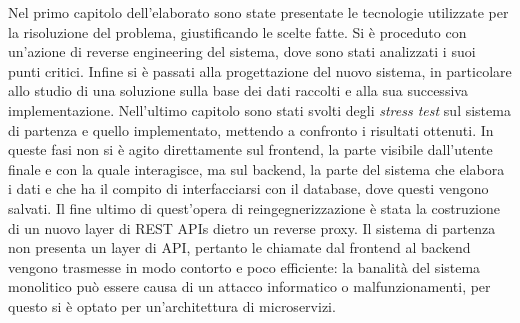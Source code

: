 \documentclass[a4paper,11pt]{article}
\begin{document}
	   Nel primo capitolo dell'elaborato sono state presentate le tecnologie utilizzate per la risoluzione del problema, giustificando le scelte fatte.  Si è proceduto con un'azione di reverse engineering del sistema, dove sono stati analizzati i suoi punti critici. Infine si è passati alla progettazione del nuovo sistema, in particolare allo studio di una soluzione sulla base dei dati raccolti e alla sua successiva implementazione. Nell'ultimo capitolo sono stati svolti degli \emph{stress test} sul sistema di partenza e quello implementato, mettendo a confronto i risultati ottenuti. In queste fasi non si è agito direttamente sul frontend, la parte visibile dall’utente finale e con la quale interagisce, ma sul backend, la parte del sistema che elabora i dati e che ha il compito di interfacciarsi con il database, dove questi vengono salvati. Il fine ultimo di quest’opera di reingegnerizzazione è stata la costruzione di un nuovo layer di REST APIs dietro un reverse proxy. Il sistema di partenza non presenta un layer di API, pertanto le chiamate dal frontend al backend vengono trasmesse in modo contorto e poco efficiente: la banalità del sistema monolitico può essere causa di un attacco informatico o malfunzionamenti, per questo si è optato per un’architettura di microservizi.
\end{document}
